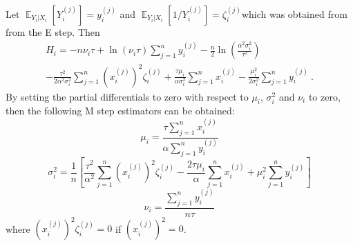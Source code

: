 \documentclass[12pt]{report}
\DeclareMathOperator{\expectation}{\mathbb{E}}
\begin{document}
Let $\expectation_{Y_i|X_i}\left[Y_i^{(j)}\right]=y_i^{(j)}$ and $\expectation_{Y_i|X_i}\left[1/Y_i^{(j)}\right]=\zeta_i^{(j)}$which was obtained from from the E step. Then
\begin{multline}
H_i= -n\nu_i\tau+\ln(\nu_i\tau)\sum_{j=1}^ny_i^{(j)}-\frac{n}{2}\ln\left(\frac{\alpha^2\sigma_i^2}{\tau^2}\right)
\\
-\frac{\tau^2}{2\alpha^2\sigma_i^2}\sum_{j=1}^n\left(x_i^{(j)}\right)^2\zeta_i^{(j)}
+ \frac{\tau\mu_i}{\alpha\sigma_i^2}\sum_{j=1}^nx_i^{(j)}
-\frac{\mu_i^2}{2\sigma_i^2}\sum_{j=1}^ny_i^{(j)}
\ .
\end{multline}
By setting the partial differentials to zero with respect to $\mu_i$, $\sigma_i^2$ and $\nu_i$ to zero, then the following M step estimators can be obtained:
\begin{equation}
\mu_i=\frac{\tau\sum_{j=1}^nx_i^{(j)}}{\alpha\sum_{j=1}^ny_i^{(j)}}
\end{equation}
\begin{equation}
\sigma_i^2=\frac{1}{n}\left[
\frac{\tau^2}{\alpha^2}\sum_{j=1}^n\left(x_i^{(j)}\right)^2\zeta_i^{(j)}
-\frac{2\tau\mu_i}{\alpha}\sum_{j=1}^nx_i^{(j)}
+\mu_i^2\sum_{j=1}^ny_i^{(j)}
\right]
\end{equation}
\begin{equation}
\nu_i=\frac{\sum_{j=1}^ny_i^{(j)}}{n\tau}
\end{equation}
where $\left(x_i^{(j)}\right)^2\zeta_i^{(j)}=0$ if $\left(x_i^{(j)}\right)^2=0$.




\end{document}
